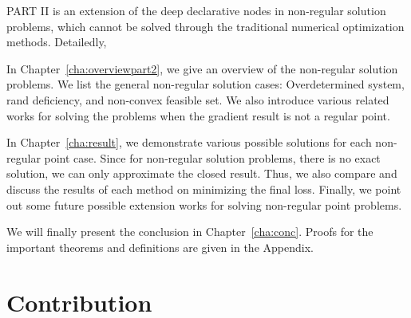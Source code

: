 \par PART II is an extension of the deep declarative nodes in non-regular solution problems, which cannot be solved through the traditional numerical optimization methods. Detailedly, 
\begin{description}
    \item In Chapter~\ref{cha:overviewpart2}, we give an overview of the non-regular solution problems. We list the general non-regular solution cases: Overdetermined system, rand deficiency, and non-convex feasible set. We also introduce various related works for solving the problems when the gradient result is not a regular point. 
    \item In Chapter~\ref{cha:result}, we demonstrate various possible solutions for each non-regular point case. Since for non-regular solution problems, there is no exact solution, we can only approximate the closed result. Thus, we also compare and discuss the results of each method on minimizing the final loss. Finally, we point out some future possible extension works for solving non-regular point problems. 
\end{description}
We will finally present the conclusion in Chapter~\ref{cha:conc}. Proofs for the important theorems and definitions are given in the Appendix.

\section{Contribution}
\label{sec.contribution}
